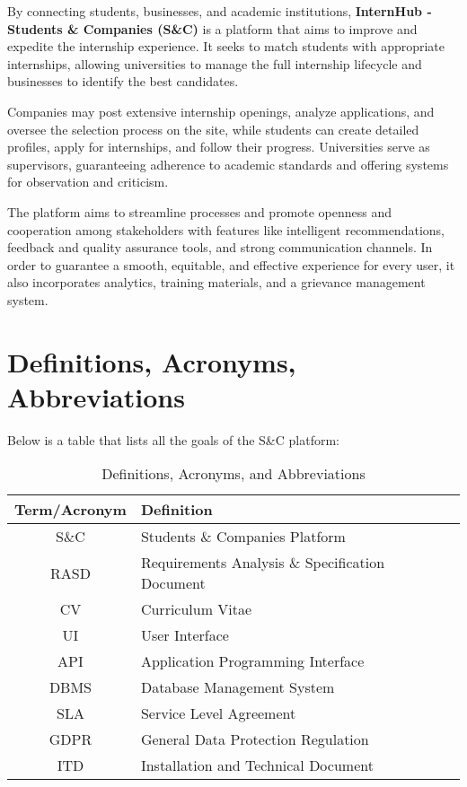 By connecting students, businesses, and academic institutions, \textbf{InternHub - Students \& Companies (S\&C)} is a platform that aims to improve and expedite the internship experience. It seeks to match students with appropriate internships, allowing universities to manage the full internship lifecycle and businesses to identify the best candidates.

Companies may post extensive internship openings, analyze applications, and oversee the selection process on the site, while students can create detailed profiles, apply for internships, and follow their progress. Universities serve as supervisors, guaranteeing adherence to academic standards and offering systems for observation and criticism.

The platform aims to streamline processes and promote openness and cooperation among stakeholders with features like intelligent recommendations, feedback and quality assurance tools, and strong communication channels. In order to guarantee a smooth, equitable, and effective experience for every user, it also incorporates analytics, training materials, and a grievance management system.


\section{Definitions, Acronyms, Abbreviations}
\label{subsec:goals}%
\setcounter{g}{1}
\newcommand{\cg}{\theg\stepcounter{g}}

Below is a table that lists all the goals of the S\&C platform:

\begin{table}[h!]
    \centering
    \begin{tabular}{|c|l|}
        \hline
        \textbf{Term/Acronym} & \textbf{Definition} \\ \hline
        S\&C & Students \& Companies Platform \\ \hline
        RASD & Requirements Analysis \& Specification Document \\ \hline
        CV & Curriculum Vitae \\ \hline
        UI & User Interface \\ \hline
        API & Application Programming Interface \\ \hline
        DBMS & Database Management System \\ \hline
        SLA & Service Level Agreement \\ \hline
        GDPR & General Data Protection Regulation \\ \hline
        ITD & Installation and Technical Document \\ \hline
    \end{tabular}
    \caption{Definitions, Acronyms, and Abbreviations}
    \label{tab:definitions}
\end{table}


